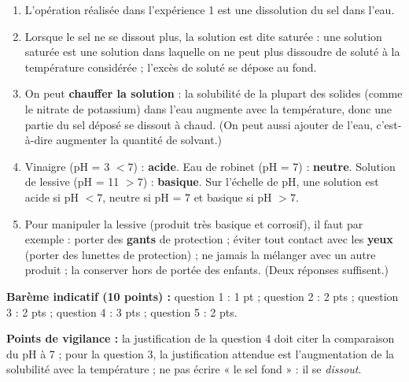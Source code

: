 \documentclass[11pt]{article}
\newcommand{\cle}[1]{{\popxbold\color{popdark}#1}}
\begin{document}
\begin{corrige}
\begin{enumerate}
\item L'opération réalisée dans l'expérience 1 est une \cle{dissolution} du sel dans l'eau.
\item Lorsque le sel ne se dissout plus, la solution est dite \cle{saturée} : une solution saturée est une solution dans laquelle on ne peut plus dissoudre de soluté à la température considérée ; l'excès de soluté se dépose au fond.
\item On peut \textbf{chauffer la solution} : la solubilité de la plupart des solides (comme le nitrate de potassium) dans l'eau augmente avec la température, donc une partie du sel déposé se dissout à chaud. (On peut aussi ajouter de l'eau, c'est-à-dire augmenter la quantité de solvant.)
\item Vinaigre (pH = 3 $< 7$) : \textbf{acide}. Eau de robinet (pH = 7) : \textbf{neutre}. Solution de lessive (pH = 11 $> 7$) : \textbf{basique}. Sur l'échelle de pH, une solution est acide si pH $< 7$, neutre si pH = 7 et basique si pH $> 7$.
\item Pour manipuler la lessive (produit très basique et corrosif), il faut par exemple : porter des \textbf{gants} de protection ; éviter tout contact avec les \textbf{yeux} (porter des lunettes de protection) ; ne jamais la mélanger avec un autre produit ; la conserver hors de portée des enfants. (Deux réponses suffisent.)
\end{enumerate}
\textbf{Barème indicatif (10 points) :} question 1 : 1 pt ; question 2 : 2 pts ; question 3 : 2 pts ; question 4 : 3 pts ; question 5 : 2 pts.

\textbf{Points de vigilance :} la justification de la question 4 doit citer la comparaison du pH à 7 ; pour la question 3, la justification attendue est l'augmentation de la solubilité avec la température ; ne pas écrire « le sel fond » : il se \emph{dissout}.
\end{corrige}
\end{document}

